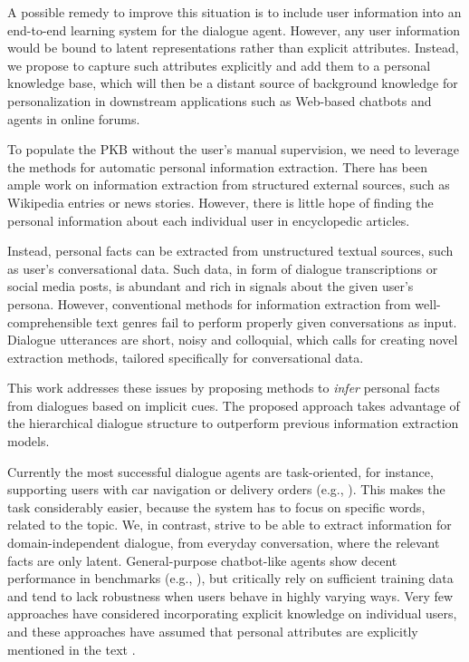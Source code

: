 \noindent A possible remedy to improve this situation is to include user information
into an end-to-end learning system for the dialogue agent. 
However, any user information would be bound to latent representations rather than explicit attributes.
Instead, we propose to capture such attributes explicitly and add them to a personal knowledge base, which will then be a distant source of background knowledge
for personalization in downstream applications such as
Web-based chatbots and agents in online forums.

To populate the PKB without the user's manual supervision, we need to leverage the methods for automatic personal information extraction. There has been ample work on information extraction from structured external sources, such as Wikipedia entries or news stories. However, there is little hope of finding the personal information about each individual user in encyclopedic articles. 

Instead, personal facts can be extracted from unstructured textual sources, such as user's conversational data. Such data, in form of dialogue transcriptions or social media posts, is abundant and rich in signals about the given user's persona. However, conventional methods for information extraction from well-comprehensible text genres fail to perform properly given conversations as input. Dialogue utterances are short, noisy and colloquial, which calls for creating novel extraction methods, tailored specifically for conversational data.

This work addresses these issues by proposing methods to \textit{infer} personal facts from dialogues based on implicit cues. The proposed approach takes advantage of the hierarchical dialogue structure to outperform previous information extraction models.

Currently the most successful dialogue agents are task-oriented, 
for instance, supporting users with car navigation or delivery orders
(e.g., \cite{dial6,AAAI1816104}).
This makes the task considerably easier, because the system has to focus on specific words, related to the topic. We, in contrast, strive to be able to extract information for domain-independent dialogue, from everyday conversation, where the relevant facts are only latent.
General-purpose chatbot-like agents show decent performance in
benchmarks (e.g., \cite{bot1,pers1,dial8}), 
but critically rely on sufficient training data and
tend to lack robustness when users behave in highly varying ways.
Very few approaches have considered incorporating explicit knowledge
on individual users, and these approaches have assumed that personal attributes
are explicitly mentioned in the text \cite{dial7,zhang2018personalizing,jing-kambhatla-roukos:2007:ACLMain}.

